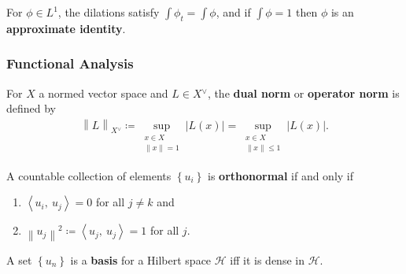 \begin{definition}

For \(\phi\in L^1\), the dilations satisfy
\(\int \phi_{t} = \int \phi\), and if \(\int \phi = 1\) then \(\phi\) is
an \textbf{approximate identity}.

\end{definition}

\hypertarget{functional-analysis}{%
\subsubsection{Functional Analysis}\label{functional-analysis}}

\begin{definition}

For \(X\) a normed vector space and \(L \in X {}^{ \vee }\), the
\textbf{dual norm} or \textbf{operator norm} is defined by
\begin{align*}
{\left\lVert {L} \right\rVert}_{X {}^{ \vee }} 
\coloneqq\sup_{ \substack{x\in X \\ {\left\lVert {x} \right\rVert} = 1} } {\left\lvert {L(x)} \right\rvert}
= \sup_{ \substack{x\in X \\ {\left\lVert {x} \right\rVert} \leq  1} } {\left\lvert {L(x)} \right\rvert}
.\end{align*}

\end{definition}

\begin{definition}

A countable collection of elements \(\left\{{ u_i }\right\}\) is
\textbf{orthonormal} if and only if

\begin{enumerate}
\def\labelenumi{\arabic{enumi}.}
\tightlist
\item
  \({\left\langle {u_i},~{u_j} \right\rangle} = 0\) for all \(j \neq k\)
  and
\item
  \({\left\lVert {u_j} \right\rVert}^2 \coloneqq{\left\langle {u_j},~{u_j} \right\rangle} = 1\)
  for all \(j\).
\end{enumerate}

\end{definition}

\begin{definition}

A set \(\left\{{u_{n}}\right\}\) is a \textbf{basis} for a Hilbert space
\({\mathcal{H}}\) iff it is dense in \({\mathcal{H}}\).

\end{definition}

